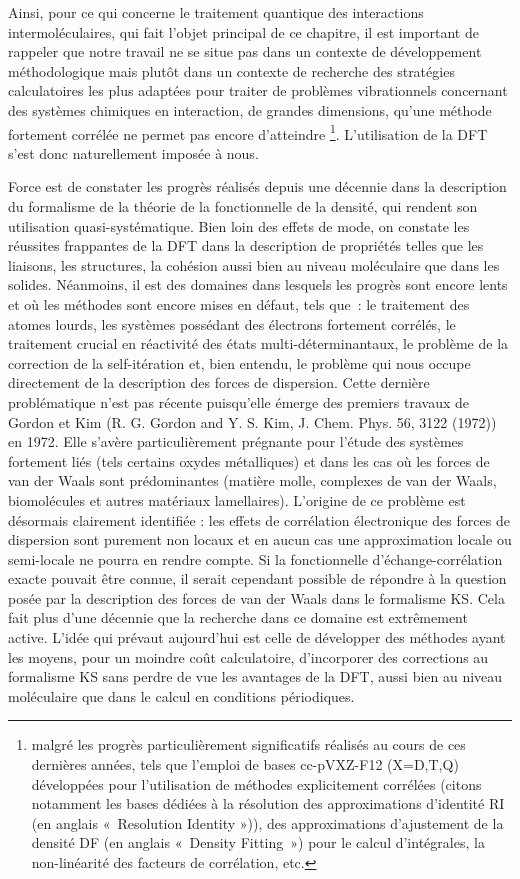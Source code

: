 \documentclass[12pt,a4paper]{book}
\begin{document}
	Ainsi, pour ce qui concerne le traitement quantique des interactions intermoléculaires, qui fait l’objet principal de ce chapitre, il est important de rappeler que notre travail ne se situe pas dans un contexte de développement méthodologique mais plutôt dans un contexte de recherche des stratégies calculatoires les plus adaptées pour traiter de problèmes vibrationnels concernant des systèmes chimiques en interaction, de grandes dimensions, qu’une méthode fortement corrélée ne permet pas encore d’atteindre \footnote{malgré les progrès particulièrement significatifs réalisés au cours de ces dernières années, tels que l’emploi de bases cc-pVXZ-F12 (X=D,T,Q) développées pour l’utilisation de méthodes explicitement corrélées (citons notamment les bases dédiées à la résolution des approximations d'identité RI (en anglais « Resolution Identity »)), des approximations d'ajustement de la densité DF (en anglais « Density Fitting ») pour le calcul d’intégrales, la non-linéarité des facteurs de corrélation, etc.}. L’utilisation de la DFT s’est donc naturellement imposée à nous.
	
	Force est de constater les progrès réalisés depuis une décennie dans la description du formalisme de la théorie de la fonctionnelle de la densité, qui rendent son utilisation quasi-systématique. Bien loin des effets de mode, on constate les réussites frappantes de la DFT dans la description de propriétés telles que les liaisons, les structures, la cohésion aussi bien au niveau moléculaire que dans les solides. Néanmoins, il est des domaines dans lesquels les progrès sont encore lents et où les méthodes sont encore mises en défaut, tels que : le traitement des atomes lourds, les systèmes possédant des électrons fortement corrélés, le traitement crucial en réactivité des états multi-déterminantaux, le problème de la correction de la self-itération et, bien entendu, le problème qui nous occupe directement de la description des forces de dispersion. Cette dernière problématique n’est pas récente puisqu'elle émerge des premiers travaux de Gordon et Kim (R. G. Gordon and Y. S. Kim, J. Chem. Phys. 56, 3122 (1972)) en 1972. Elle s’avère particulièrement prégnante pour l’étude des systèmes fortement liés (tels certains oxydes métalliques) et dans les cas où les forces de van der Waals sont prédominantes (matière molle, complexes de van der Waals, biomolécules et autres matériaux lamellaires). L’origine de ce problème est désormais clairement identifiée : les effets de corrélation électronique des forces de dispersion sont purement non locaux et en aucun cas une approximation locale ou semi-locale ne pourra en rendre compte. Si la fonctionnelle d’échange-corrélation exacte pouvait être connue, il serait cependant possible de répondre à la question posée par la description des forces de van der Waals dans le formalisme KS. Cela fait plus d’une décennie que la recherche dans ce domaine est extrêmement active. L’idée qui prévaut aujourd’hui est celle de développer des méthodes ayant les moyens, pour un moindre coût calculatoire, d’incorporer des corrections au formalisme KS sans perdre de vue les avantages de la DFT, aussi bien au niveau moléculaire que dans le calcul en conditions périodiques. 
	
\end{document}
